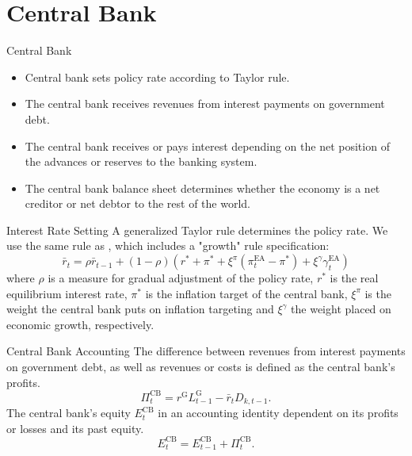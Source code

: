 \documentclass[9pt]{beamer}
\begin{document}
\section{Central Bank}
\begin{frame}{Central Bank}
\label{CentralBank}
    \begin{itemize}
        \item Central bank sets policy rate according to Taylor rule.
        \item The central bank receives revenues from interest payments on government debt.
        \item The central bank receives or pays interest depending on the net position of the advances or reserves to the banking system.
        \item The central bank balance sheet determines whether the economy is a net creditor or net debtor to the rest of the world.
    \end{itemize}
    \hyperlink{ReturnOverview}{}

\end{frame}
\begin{frame}{Interest Rate Setting}
    A generalized Taylor rule\citep{taylor_discretion_1993} determines the policy rate. We use the same rule as \cite{blattner_towards_2010}, which includes a "growth" rule specification: 
\begin{equation}
    \bar{r}_t=\rho \bar{r}_{t-1}+(1-\rho)\left(r^*+\pi^*+\xi^\pi\left(\pi^{\mathrm{EA}}_t-\pi^*\right)+\xi^\gamma \gamma^{\mathrm{EA}}_t\right)
\end{equation}
where $\rho$ is a measure for gradual adjustment of the policy rate, $r^*$ is the real equilibrium interest rate, $\pi^*$ is the inflation target of the central bank, $ \xi^\pi$ is the weight the central bank puts on inflation targeting and $\xi^\gamma$ the weight placed on economic growth, respectively. 
\hyperlink{ReturnOverview}{}

\end{frame}
\begin{frame}{Central Bank Accounting}
    The difference between revenues from interest payments on government debt, as well as revenues or costs  is defined as the central bank's profits.
\begin{equation}
    \Pi^{\mathrm{CB}}_t=r^{\mathrm{G}} L^{\mathrm{G}}_{t-1}-\bar{r}_t D_{k,t-1} .
\end{equation}
The central bank's equity $E^{\mathrm{CB}}_t$ in an accounting identity dependent on its profits or losses and its past equity. 
\begin{equation}
    E^{\mathrm{CB}}_t=E^{\mathrm{CB}}_{t-1}+\Pi^{\mathrm{CB}}_t .
\end{equation}
\hyperlink{ReturnOverview}{}

\end{frame}
\end{document}
